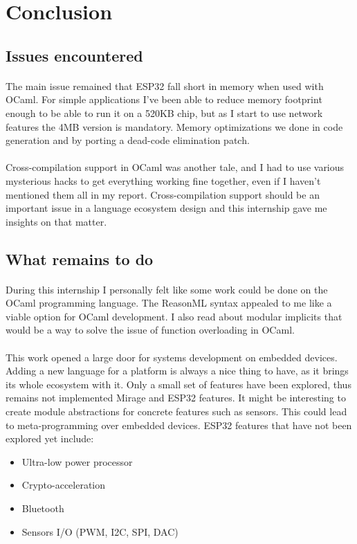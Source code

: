 \documentclass[a4paper]{article}
\begin{document}
\section{Conclusion}
\subsection{Issues encountered}
\paragraph{}
The main issue remained that ESP32 fall short in memory when used with OCaml. For simple applications I've been able to reduce memory footprint enough to be able to run it on a 520KB chip, but as I start to use network features the 4MB version is mandatory. Memory optimizations we done in code generation and by porting a dead-code elimination patch. 
\paragraph{}
Cross-compilation support in OCaml was another tale, and I had to use various mysterious hacks to get everything working fine together, even if I haven't mentioned them all in my report. Cross-compilation support should be an important issue in a language ecosystem design and this internship gave me insights on that matter.
\subsection{What remains to do}
\paragraph{}
During this internship I personally felt like some work could be done on the OCaml programming language. The ReasonML syntax appealed to me like a viable option for OCaml development. I also read about modular implicits \cite{white2015modular} that would be a way to solve the issue of function overloading in OCaml. 
\paragraph{}
This work opened a large door for systems development on embedded devices. Adding a new language for a platform is always a nice thing to have, as it brings its whole ecosystem with it. Only a small set of features have been explored, thus remains not implemented Mirage and ESP32 features. It might be interesting to create module abstractions for concrete features such as sensors. This could lead to meta-programming over embedded devices. 
ESP32 features that have not been explored yet include:
\begin{itemize}[itemsep=0pt,parsep=0pt]
\item Ultra-low power processor
\item Crypto-acceleration
\item Bluetooth
\item Sensors I/O (PWM, I2C, SPI, DAC)
\end{itemize}
\end{document}
